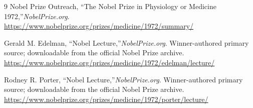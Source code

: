 \begin{thebibliography}{9}
Nobel Prize Outreach, ``The Nobel Prize in Physiology or Medicine 1972,''\emph{NobelPrize.org}.\\
\url{https://www.nobelprize.org/prizes/medicine/1972/summary/}

Gerald M. Edelman, ``Nobel Lecture,''\emph{NobelPrize.org}. Winner-authored primary source; downloadable from the official Nobel Prize archive.\\
\url{https://www.nobelprize.org/prizes/medicine/1972/edelman/lecture/}

Rodney R. Porter, ``Nobel Lecture,''\emph{NobelPrize.org}. Winner-authored primary source; downloadable from the official Nobel Prize archive.\\
\url{https://www.nobelprize.org/prizes/medicine/1972/porter/lecture/}
\end{thebibliography}
